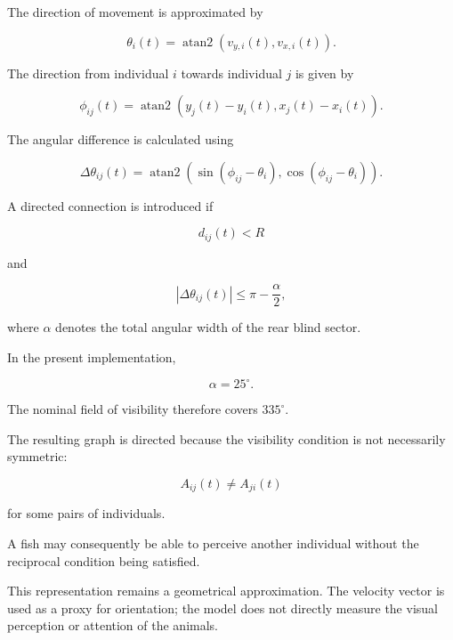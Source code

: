 \documentclass[10pt,a4paper]{article}
\begin{document}
The direction of movement is approximated by

\begin{equation}
\theta_i(t)=
\operatorname{atan2}
\left(v_{y,i}(t),v_{x,i}(t)\right).
\end{equation}

The direction from individual $i$ towards individual
$j$ is given by

\begin{equation}
\phi_{ij}(t)=
\operatorname{atan2}
\left(
y_j(t)-y_i(t),
x_j(t)-x_i(t)
\right).
\end{equation}

The angular difference is calculated using

\begin{equation}
\Delta\theta_{ij}(t)=
\operatorname{atan2}
\left(
\sin(\phi_{ij}-\theta_i),
\cos(\phi_{ij}-\theta_i)
\right).
\end{equation}

A directed connection is introduced if

\begin{equation}
d_{ij}(t)<R
\end{equation}

and

\begin{equation}
|\Delta\theta_{ij}(t)|
\leq
\pi-\frac{\alpha}{2},
\end{equation}

where $\alpha$ denotes the total angular width
of the rear blind sector.

In the present implementation,

\begin{equation}
\alpha=25^{\circ}.
\end{equation}

The nominal field of visibility therefore covers
$335^{\circ}$.

The resulting graph is directed because the visibility
condition is not necessarily symmetric:

\begin{equation}
A_{ij}(t)\neq A_{ji}(t)
\end{equation}

for some pairs of individuals.

A fish may consequently be able to perceive another
individual without the reciprocal condition being
satisfied.

This representation remains a geometrical approximation.
The velocity vector is used as a proxy for orientation;
the model does not directly measure the visual perception
or attention of the animals.
\end{document}
